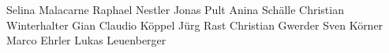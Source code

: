Selina Malacarne
Raphael Nestler
Jonas Pult
Anina Schälle
Christian Winterhalter
Gian Claudio Köppel
Jürg Rast
Christian Gwerder
Sven Körner
Marco Ehrler
Lukas Leuenberger
